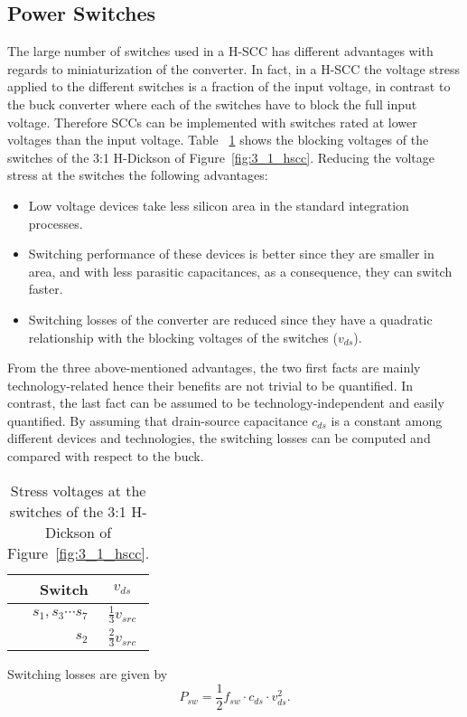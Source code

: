 \subsection{Power Switches}
The large number of switches used in a H-SCC has different advantages with regards to miniaturization of the converter. In fact, in a H-SCC the voltage stress applied to the different switches is a fraction of the input voltage, in contrast to the buck converter where each of the switches have to block the full input voltage. Therefore SCCs can be implemented with switches rated at lower voltages than the input voltage. Table ~\ref{tab:3:1 H-Dick_V_stress} shows the blocking voltages of the switches of the 3:1 H-Dickson of Figure~\ref{fig:3_1_hscc}. Reducing the voltage stress at the switches the following advantages:
\begin{itemize}
  \item Low voltage devices take less silicon area in the standard integration processes.
  \item Switching performance of these devices is better since they are smaller in area, and with less parasitic capacitances, as a consequence, they can switch faster.
  \item Switching losses of the converter are reduced since they have a quadratic relationship with the blocking voltages of the switches ($v_{ds}$).
\end{itemize}
From the three above-mentioned advantages, the two first facts are mainly technology-related hence their benefits are not trivial to be quantified. In contrast, the last fact can be assumed to be technology-independent and easily quantified. By assuming that drain-source capacitance $c_{ds}$ is a constant among different devices and technologies, the switching losses can be computed and compared with respect to the buck. 
\begin{table}[h]
\centering
\caption{Stress voltages at the switches of the 3:1 H-Dickson of Figure~\ref{fig:3_1_hscc}.}
\label{tab:3:1 H-Dick_V_stress}
\renewcommand{\arraystretch}{1.5}%
\begin{tabular}{r  c}
 Switch & $v_{ds}$  \\
 \midrule
 $s_1,s_3 \cdots s_7$ & $\frac{1}{3} v_{src}$ \\
 $s_2$ & $\frac{2 }{3} v_{src}$
\end{tabular}
\end{table}
Switching losses are given by~\cite{2001Erickson}
\begin{equation}
P_{sw} = \frac{1}{2} f_{sw} \cdot c_{ds} \cdot v_{ds}^2.
\label{eq:p_sw_dev}
\end{equation}
